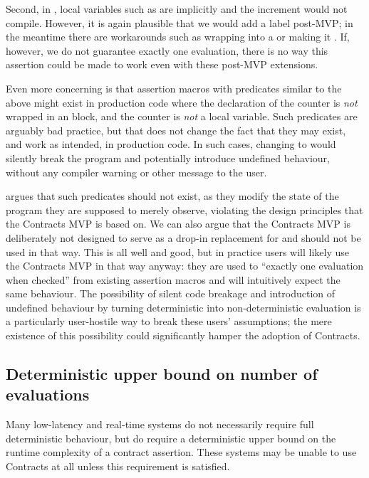 Second, in \cite{P2900R6}, local variables such as  are implicitly  and the increment would not compile. However, it is again plausible that we would add a  label post-MVP; in the meantime there are workarounds such as wrapping  into a  or making it . If, however, we do not guarantee exactly one evaluation, there is no way this assertion could be made to work even with these post-MVP extensions.

Even more concerning is that assertion macros with predicates similar to the above might exist in production code where the declaration of the counter is \emph{not} wrapped in an  block, and the counter is \emph{not} a local variable. Such predicates are arguably bad practice, but that does not change the fact that they may exist, and work as intended, in production code. In such cases, changing  to  would silently break the program and potentially introduce undefined behaviour, without any compiler warning or other message to the user. 

\cite{P2900R6} argues that such predicates should not exist, as they modify the state of the program they are supposed to merely observe, violating the design principles that the Contracts MVP is based on. We can also argue that the Contracts MVP is deliberately not designed to serve as a drop-in replacement for  and should not be used in that way. This is all well and good, but in practice users will likely use the Contracts MVP in that way anyway: they are used to ``exactly one evaluation when checked'' from existing assertion macros and will intuitively expect the same behaviour. The possibility of silent code breakage and introduction of undefined behaviour by turning deterministic into non-deterministic evaluation is a particularly user-hostile way to break these users' assumptions; the mere existence of this possibility could significantly hamper the adoption of Contracts.

\subsection{Deterministic upper bound on number of evaluations}
\label{subsec:upper}

Many low-latency and real-time systems do not necessarily require full deterministic behaviour, but do require a deterministic upper bound on the runtime complexity of a contract assertion. These systems may be unable to use Contracts at all unless this requirement is satisfied.


